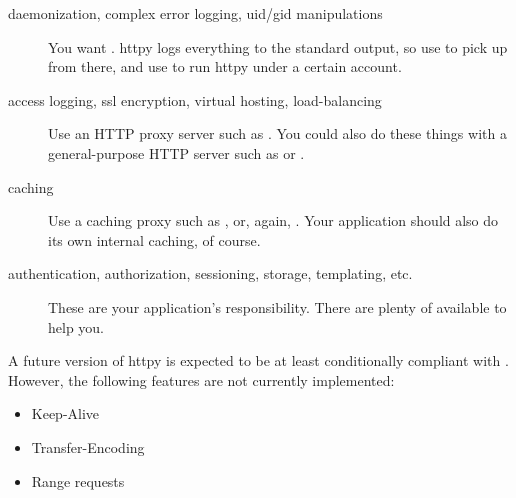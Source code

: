 \begin{description}

\item[daemonization, complex error logging, uid/gid manipulations]
    {You want . httpy logs everything to the
    standard output, so use
     to pick up from
    there, and use 
    to run httpy under a certain account.}

\item[access logging, ssl encryption, virtual hosting, load-balancing]
    {Use an HTTP proxy server such as .
    You could also do these things with a general-purpose HTTP server such as
     or
    .}

\item[caching]
    {Use a caching proxy such as , or,
    again, . Your application should
    also do its own internal caching, of course.}

\item[authentication, authorization, sessioning, storage, templating, etc.]
    {These are your application's responsibility. There are plenty of
     available to help
    you.}

\end{description}


A future version of httpy is expected to be at least conditionally compliant
with .
However, the following features are not currently implemented:

\begin{itemize}
\item
Keep-Alive\item
Transfer-Encoding\item
Range requests
\end{itemize}